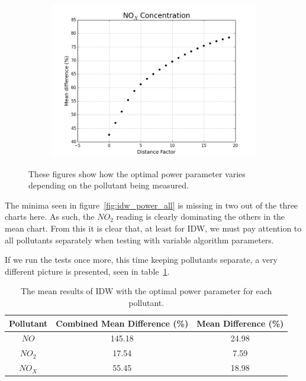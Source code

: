 \begin{figure}
                \begin{subfigure}{0.5\textwidth}
                    \centering
                    \includegraphics[width=\linewidth]{./images/IDW_P_NOx.png}
                    \caption{}
                    \label{fig:idw_power_NOx}
                \end{subfigure}
                \caption{These figures show how the optimal power parameter varies depending on the pollutant being measured.}
                \label{fig:idw_pollutant_compare}
            \end{figure}

            The minima seen in figure~\ref{fig:idw_power_all} is missing in two out of the three charts here. As such, the $NO_{2}$ reading is clearly dominating the others in the mean chart. From this it is clear that, at least for IDW, we must pay attention to all pollutants separately when testing with variable algorithm parameters. 

            If we run the tests once more, this time keeping pollutants separate, a very different picture is presented, seen in table~\ref{tab:idw_results_2}.

			\begin{table}
				\centering
	    		\begin{tabular}{|c|c|c|}
	    			\hline
					Pollutant & Combined Mean Difference (\%) & Mean Difference (\%) \\ \hline
					$NO$ & 145.18 & 24.98 \\
					$NO_{2}$ & 17.54 & 7.59 \\
					$NO_{X}$ & 55.45 & 18.98 \\
					\hline
				\end{tabular}
				\caption{The mean results of IDW with the optimal power parameter for each pollutant.}
				\label{tab:idw_results_2}
			\end{table} 

